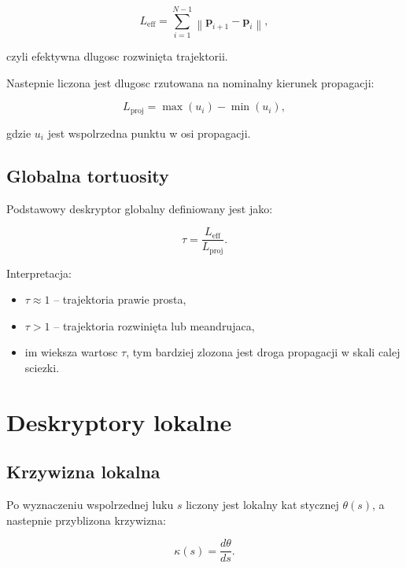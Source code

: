 \documentclass[11pt,a4paper]{article}
\begin{document}
\begin{equation}
    L_{\mathrm{eff}} = \sum_{i=1}^{N-1} \left\| \mathbf{p}_{i+1} - \mathbf{p}_i \right\|,
\end{equation}

czyli efektywna dlugosc rozwinięta trajektorii.

Nastepnie liczona jest dlugosc rzutowana na nominalny kierunek propagacji:

\begin{equation}
    L_{\mathrm{proj}} = \max(u_i) - \min(u_i),
\end{equation}

gdzie \(u_i\) jest wspolrzedna punktu w osi propagacji.

\subsection{Globalna tortuosity}

Podstawowy deskryptor globalny definiowany jest jako:

\begin{equation}
    \tau = \frac{L_{\mathrm{eff}}}{L_{\mathrm{proj}}}.
\end{equation}

Interpretacja:

\begin{itemize}[leftmargin=1.5em]
    \item \(\tau \approx 1\) -- trajektoria prawie prosta,
    \item \(\tau > 1\) -- trajektoria rozwinięta lub meandrujaca,
    \item im wieksza wartosc \(\tau\), tym bardziej zlozona jest droga
    propagacji w skali calej sciezki.
\end{itemize}

\section{Deskryptory lokalne}

\subsection{Krzywizna lokalna}

Po wyznaczeniu wspolrzednej luku \(s\) liczony jest lokalny kat stycznej
\(\theta(s)\), a nastepnie przyblizona krzywizna:

\begin{equation}
    \kappa(s) = \frac{d\theta}{ds}.
\end{equation}
\end{document}
